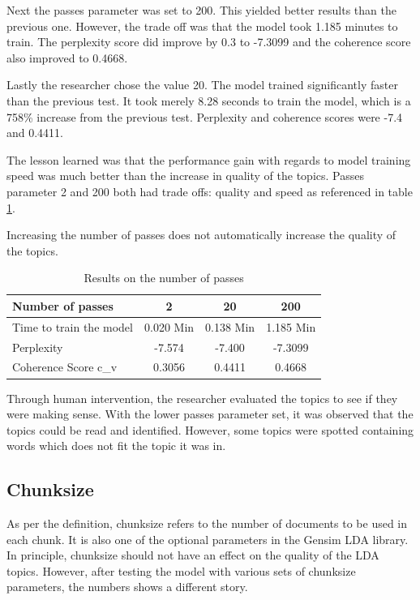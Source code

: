 Next the passes parameter was set to 200. This yielded better results than the previous one. However, the trade off was that the model took 1.185 minutes to train. The perplexity score did improve by 0.3 to -7.3099 and the coherence score also improved to 0.4668.

Lastly the researcher chose the value 20. The model trained significantly faster than the previous test. It took merely 8.28 seconds to train the model, which is a 758\% increase from the previous test. Perplexity and coherence scores were -7.4 and 0.4411.

The lesson learned was that the performance gain with regards to model training speed was much better than the increase in quality of the topics. Passes parameter 2 and 200 both had trade offs: quality and speed as referenced in table \ref{tab:passes}.

\begin{lesson}
Increasing the number of passes does not automatically increase the quality of the topics. 
\end{lesson}\label{L:quality}

\begin{table}[]
\centering
\begin{tabular}{|l|c|c|c|}
\hline
Number of passes & 2 & 20 & 200 \\ \hline
Time to train the model & 0.020 Min & 0.138 Min & 1.185 Min \\ \hline
Perplexity & -7.574 & -7.400 & -7.3099 \\ \hline
Coherence Score c\_v & 0.3056 & 0.4411 & 0.4668 \\ \hline
\end{tabular}
\caption{Results on the number of passes}
\label{tab:passes}
\end{table}

Through human intervention, the researcher evaluated the topics to see if they were making sense. With the lower passes parameter set, it was observed that the topics could be read and identified. However, some topics were spotted containing words which does not fit the topic it was in.

\subsection{Chunksize}
As per the definition, chunksize refers to the number of documents to be used in each chunk. It is also one of the optional parameters in the Gensim LDA library. In principle, chunksize should not have an effect on the quality of the LDA topics. However, after testing the model with various sets of chunksize parameters, the numbers shows a different story.

